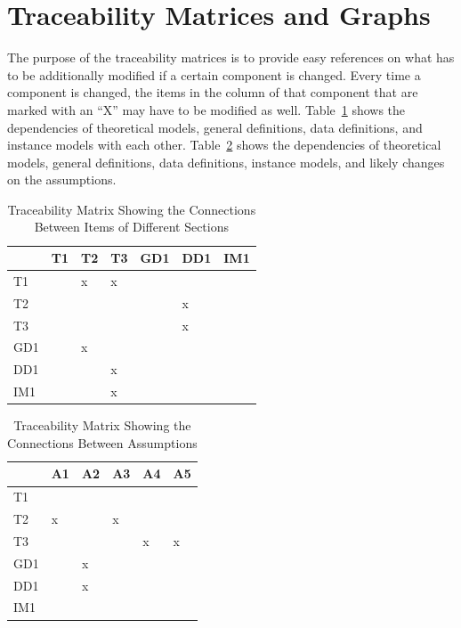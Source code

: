 \documentclass[12pt]{article}
\begin{document}
\section{Traceability Matrices and Graphs}

{The purpose of the traceability matrices is to provide easy references on what
has to be additionally modified if a certain component is changed.  Every time a
component is changed, the items in the column of that component that are marked with an ``X'' may have to be modified as well.  Table~\ref{Table:trace} shows the
dependencies of theoretical models, general definitions, data definitions, and instance models with each other.  Table~\ref{Table:R_trace} shows the dependencies of theoretical models,
general definitions, data definitions, instance models, and likely changes on the assumptions.}


\begin{table}[h!]
    \centering
    \begin{tabular}{|l|l|l|l|l|l|l|}
    \hline
        ~ & T1 & T2 & T3 & GD1 & DD1 & IM1 \\ \hline
        T1 & ~ & x & x & ~ & ~ & ~ \\ \hline
        T2 & ~ & ~ & ~ & ~ & x & ~ \\ \hline
        T3 & ~ & ~ & ~ & ~ & x & ~ \\ \hline
        GD1 & ~ & x & ~ & ~ & ~ & ~ \\ \hline
        DD1 & ~ & ~ & x & ~ & ~ & ~ \\ \hline
        IM1 & ~ & ~ & x & ~ & ~ & ~ \\ \hline
    \end{tabular}

\caption{Traceability Matrix Showing the Connections Between Items of Different Sections}
\label{Table:trace}
\end{table}

\begin{table}[!ht]
    \centering
    \begin{tabular}{|l|l|l|l|l|l|}
    \hline
        ~ & A1 & A2 & A3 & A4 & A5 \\ \hline
        T1 & ~ & ~ & ~ & ~ & ~ \\ \hline
        T2 & x & ~ & x & ~ & ~ \\ \hline
        T3 & ~ & ~ & ~ & x & x \\ \hline
        GD1 & ~ & x & ~ & ~ & ~ \\ \hline
        DD1 & ~ & x & ~ & ~ & ~ \\ \hline
        IM1 & ~ & ~ & ~ & ~ & ~ \\ \hline
    \end{tabular}
\caption{Traceability Matrix Showing the Connections Between Assumptions}
\label{Table:R_trace}
\end{table}
\end{document}

